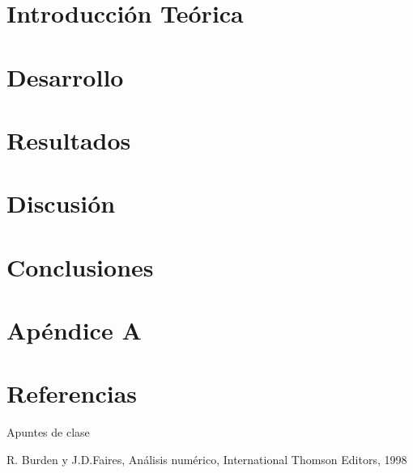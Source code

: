 \documentclass[a4paper]{article}
\begin{document}
\thispagestyle{empty}

\maketitle
\newpage

\thispagestyle{empty}
\vfill
\begin{abstract}

\end{abstract}

\thispagestyle{empty}
\vspace{3cm}
\tableofcontents
\newpage


\newpage

\section{Introducci\'{o}n Te\'{o}rica}
\label{sec:intro}


\newpage

\section{Desarrollo}
\label{sec:desarrollo}


\newpage

\section{Resultados}
\label{sec:res}



\newpage

\section{Discusi\'{o}n}
\label{sec:discusion}


\newpage

\section{Conclusiones}
\label{sec:conclusiones}



\newpage
\section{Apéndice A}
\label{sec:ApA}



\newpage

\section{Referencias}
\label{sec:ref}

Apuntes de clase

R. Burden y J.D.Faires, Análisis numérico, International Thomson Editors, 1998
\end{document}
